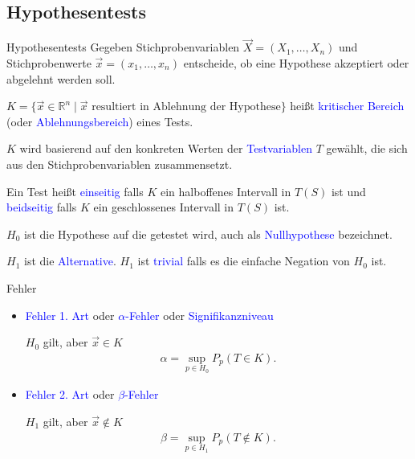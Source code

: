 \documentclass{beamer}
\def\padding{\vspace{0.5cm}}
\def\b{\textcolor{blue}}
\begin{document}
\subsection{Hypothesentests}
\begin{frame}{Hypothesentests}
    Gegeben Stichprobenvariablen $\overrightarrow{X} = (X_1, \dots, X_n)$ und Stichprobenwerte $\overrightarrow{x} = (x_1, \dots, x_n)$ entscheide, ob eine Hypothese akzeptiert oder abgelehnt werden soll.\pause\par\padding
    $K = \{\overrightarrow{x} \in \mathbb{R}^n \mid \overrightarrow{x} \text{ resultiert in Ablehnung der Hypothese}\}$ heißt \b{kritischer Bereich} (oder \b{Ablehnungsbereich}) eines Tests.\pause\par\padding
    $K$ wird basierend auf den konkreten Werten der \b{Testvariablen} $T$ gewählt, die sich aus den Stichprobenvariablen zusammensetzt.\pause\par\padding
    Ein Test heißt \b{einseitig} falls $K$ ein halboffenes Intervall in $T(S)$ ist und \b{beidseitig} falls $K$ ein geschlossenes Intervall in $T(S)$ ist.
\end{frame}

\begin{frame}
    $H_0$ ist die Hypothese auf die getestet wird, auch als \b{Nullhypothese} bezeichnet.\par
    $H_1$ ist die \b{Alternative}. $H_1$ ist \b{trivial} falls es die einfache Negation von $H_0$ ist.\pause\par\padding
    \begin{block}{Fehler}
        \begin{itemize}
            \item \b{Fehler 1. Art} oder \b{$\alpha$-Fehler} oder \b{Signifikanzniveau}\par
                $H_0$ gilt, aber $\overrightarrow{x} \in K$
                \begin{align*}
                    \alpha = \sup_{p \in H_0} P_p(T \in K).
                \end{align*}\pause
            \item \b{Fehler 2. Art} oder \b{$\beta$-Fehler}\par
                $H_1$ gilt, aber $\overrightarrow{x} \not\in K$
                \begin{align*}
                    \beta = \sup_{p \in H_1} P_p(T \not\in K).
                \end{align*}
        \end{itemize}
    \end{block}
\end{frame}
\end{document}
